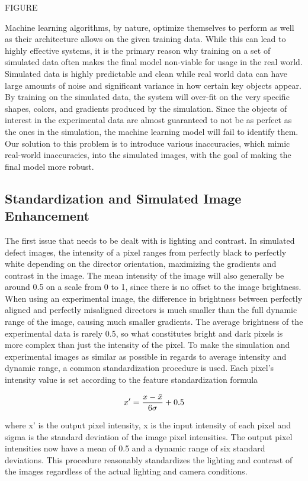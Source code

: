\documentclass[prl,reprint,showpacs,floatfix,nofootinbib]{revtex4-1}
\begin{document}
FIGURE

Machine learning algorithms, by nature, optimize themselves to perform as well as their architecture allows on the given training data. While this can lead to highly effective systems, it is the primary reason why training on a set of simulated data often makes the final model non-viable for usage in the real world. Simulated data is highly predictable and clean while real world data can have large amounts of noise and significant variance in how certain key objects appear. By training on the simulated data, the system will over-fit on the very specific shapes, colors, and gradients produced by the simulation. Since the objects of interest in the experimental data are almost guaranteed to not be as perfect as the ones in the simulation, the machine learning model will fail to identify them. Our solution to this problem is to introduce various inaccuracies, which mimic real-world inaccuracies, into the simulated images, with the goal of making the final model more robust.

\subsection{Standardization and Simulated Image Enhancement}

The first issue that needs to be dealt with is lighting and contrast. In simulated defect images, the intensity of a pixel ranges from perfectly black to perfectly white depending on the director orientation, maximizing the gradients and contrast in the image. The mean intensity of the image will also generally be around 0.5 on a scale from 0 to 1, since there is no offset to the image brightness. When using an experimental image, the difference in brightness between perfectly aligned and perfectly misaligned directors is much smaller than the full dynamic range of the image, causing much smaller gradients. The average brightness of the experimental data is rarely 0.5, so what constitutes bright and dark pixels is more complex than just the intensity of the pixel. To make the simulation and experimental images as similar as possible in regards to average intensity and dynamic range, a common standardization procedure is used. Each pixel's intensity value is set according to the feature standardization formula 

$$ x' = \frac{x - \Bar{x}}{6\sigma} +0.5 $$

where x' is the output pixel intensity, x is the input intensity of each pixel and sigma is the standard deviation of the image pixel intensities. The output pixel intensities now have a mean of 0.5 and a dynamic range of six standard deviations. This procedure reasonably standardizes the lighting and contrast of the images regardless of the actual lighting and camera conditions.
\end{document}
